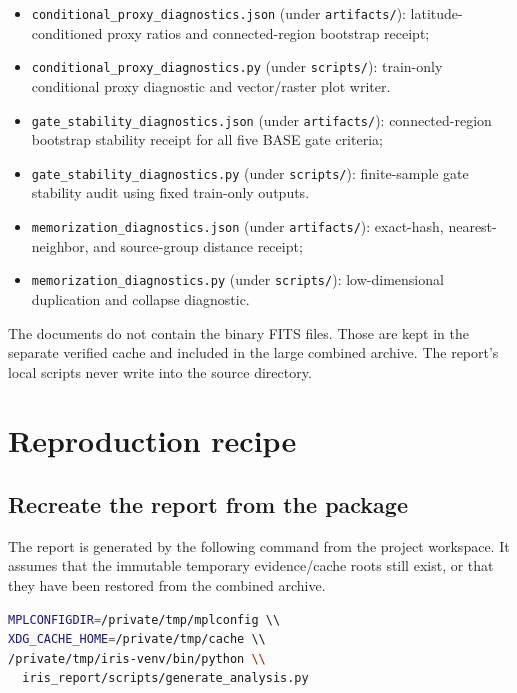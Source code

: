 \documentclass[11pt,oneside]{report}
\begin{document}
\begin{itemize}
\item \texttt{conditional\_proxy\_diagnostics.json} (under \texttt{artifacts/}): latitude-conditioned proxy ratios and connected-region bootstrap receipt;
\item \texttt{conditional\_proxy\_diagnostics.py} (under \texttt{scripts/}): train-only conditional proxy diagnostic and vector/raster plot writer.
\item \texttt{gate\_stability\_diagnostics.json} (under \texttt{artifacts/}): connected-region bootstrap stability receipt for all five BASE gate criteria;
\item \texttt{gate\_stability\_diagnostics.py} (under \texttt{scripts/}): finite-sample gate stability audit using fixed train-only outputs.
\item \texttt{memorization\_diagnostics.json} (under \texttt{artifacts/}): exact-hash, nearest-neighbor, and source-group distance receipt;
\item \texttt{memorization\_diagnostics.py} (under \texttt{scripts/}): low-dimensional duplication and collapse diagnostic.
\end{itemize}

The documents do not contain the binary FITS files. Those are kept in the separate verified cache and included in the large combined archive. The report’s local scripts never write into the source directory.

\chapter{Reproduction recipe}

\section{Recreate the report from the package}

The report is generated by the following command from the project workspace. It assumes that the immutable temporary evidence/cache roots still exist, or that they have been restored from the combined archive.

\begin{lstlisting}[language=bash]
MPLCONFIGDIR=/private/tmp/mplconfig \\
XDG_CACHE_HOME=/private/tmp/cache \\
/private/tmp/iris-venv/bin/python \\
  iris_report/scripts/generate_analysis.py
\end{lstlisting}
\end{document}
